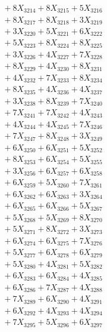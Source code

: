 \documentclass[a4paper,10pt]{article}
\begin{document}
{\begin{align}
&\;  + 8 X_{3214} + 8 X_{3215} + 5 X_{3216} \\[0.3ex]
&\;  + 8 X_{3217} + 8 X_{3218} + 3 X_{3219} \\[0.5ex]\allowbreak
&\;  + 3 X_{3220} + 5 X_{3221} + 6 X_{3222} \\[0.3ex]
&\;  + 5 X_{3223} + 8 X_{3224} + 8 X_{3225} \\[0.3ex]
&\;  + 3 X_{3226} + 4 X_{3227} + 7 X_{3228} \\[0.3ex]
&\;  + 8 X_{3229} + 4 X_{3230} + 8 X_{3231} \\[0.3ex]
&\;  + 4 X_{3232} + 7 X_{3233} + 8 X_{3234} \\[0.3ex]
&\;  + 8 X_{3235} + 4 X_{3236} + 4 X_{3237} \\[0.3ex]
&\;  + 3 X_{3238} + 8 X_{3239} + 7 X_{3240} \\[0.3ex]
&\;  + 7 X_{3241} + 7 X_{3242} + 4 X_{3243} \\[0.3ex]
&\;  + 4 X_{3244} + 4 X_{3245} + 7 X_{3246} \\[0.3ex]
&\;  + 7 X_{3247} + 8 X_{3248} + 3 X_{3249} \\[0.5ex]\allowbreak
&\;  + 6 X_{3250} + 6 X_{3251} + 5 X_{3252} \\[0.3ex]
&\;  + 8 X_{3253} + 6 X_{3254} + 5 X_{3255} \\[0.3ex]
&\;  + 3 X_{3256} + 6 X_{3257} + 6 X_{3258} \\[0.3ex]
&\;  + 6 X_{3259} + 5 X_{3260} + 7 X_{3261} \\[0.3ex]
&\;  + 6 X_{3262} + 6 X_{3263} + 3 X_{3264} \\[0.3ex]
&\;  + 6 X_{3265} + 6 X_{3266} + 5 X_{3267} \\[0.3ex]
&\;  + 5 X_{3268} + 5 X_{3269} + 8 X_{3270} \\[0.3ex]
&\;  + 5 X_{3271} + 8 X_{3272} + 3 X_{3273} \\[0.3ex]
&\;  + 6 X_{3274} + 6 X_{3275} + 7 X_{3276} \\[0.3ex]
&\;  + 5 X_{3277} + 6 X_{3278} + 6 X_{3279} \\[0.5ex]\allowbreak
&\;  + 5 X_{3280} + 4 X_{3281} + 5 X_{3282} \\[0.3ex]
&\;  + 6 X_{3283} + 6 X_{3284} + 4 X_{3285} \\[0.3ex]
&\;  + 6 X_{3286} + 7 X_{3287} + 4 X_{3288} \\[0.3ex]
&\;  + 7 X_{3289} + 6 X_{3290} + 4 X_{3291} \\[0.3ex]
&\;  + 6 X_{3292} + 4 X_{3293} + 4 X_{3294} \\[0.3ex]
&\;  + 7 X_{3295} + 5 X_{3296} + 6 X_{3297} \\[0.3ex]

\end{align}}
\end{document}
